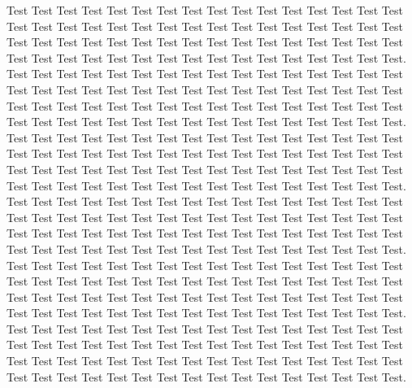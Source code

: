 Test Test Test Test Test Test Test Test Test Test Test Test Test Test Test Test Test Test Test Test Test Test Test Test Test Test Test Test Test Test Test Test Test Test Test Test Test Test Test Test Test Test Test Test Test Test Test Test Test Test Test Test Test Test Test Test Test Test Test Test Test Test Test Test.
Test Test Test Test Test Test Test Test Test Test Test Test Test Test Test Test Test Test Test Test Test Test Test Test Test Test Test Test Test Test Test Test Test Test Test Test Test Test Test Test Test Test Test Test Test Test Test Test Test Test Test Test Test Test Test Test Test Test Test Test Test Test Test Test.
Test Test Test Test Test Test Test Test Test Test Test Test Test Test Test Test Test Test Test Test Test Test Test Test Test Test Test Test Test Test Test Test Test Test Test Test Test Test Test Test Test Test Test Test Test Test Test Test Test Test Test Test Test Test Test Test Test Test Test Test Test Test Test Test.
Test Test Test Test Test Test Test Test Test Test Test Test Test Test Test Test Test Test Test Test Test Test Test Test Test Test Test Test Test Test Test Test Test Test Test Test Test Test Test Test Test Test Test Test Test Test Test Test Test Test Test Test Test Test Test Test Test Test Test Test Test Test Test Test.
Test Test Test Test Test Test Test Test Test Test Test Test Test Test Test Test Test Test Test Test Test Test Test Test Test Test Test Test Test Test Test Test Test Test Test Test Test Test Test Test Test Test Test Test Test Test Test Test Test Test Test Test Test Test Test Test Test Test Test Test Test Test Test Test.
Test Test Test Test Test Test Test Test Test Test Test Test Test Test Test Test Test Test Test Test Test Test Test Test Test Test Test Test Test Test Test Test Test Test Test Test Test Test Test Test Test Test Test Test Test Test Test Test Test Test Test Test Test Test Test Test Test Test Test Test Test Test Test Test.


